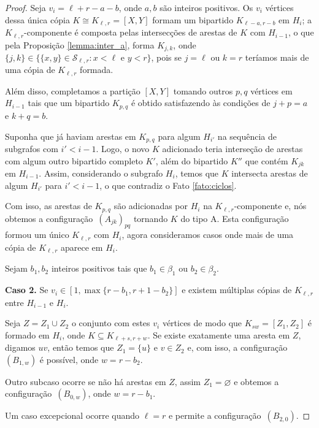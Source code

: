 \documentclass[12pt,a4paper]{book}
\newcommand{\K}{K_{\ell,r}} %
\newcommand{\Slr}{\mathcal{S}_{\ell,r}} %
\let\subset\subseteq
\begin{document}
\begin{proof}
    Seja $v_i= \ell+r-a-b$, onde $a,b$ são inteiros positivos.  
    Os $v_i$ vértices dessa única cópia $K \cong \K= [X,Y]$ formam um bipartido $K_{\ell-a,r-b}$ em $H_i$; a $\K$-componente é composta pelas intersecções de arestas de $K$ com $H_{i-1}$, 
    o que pela Proposição \ref{lemma:inter_a},  forma $K_{j,k}$,
    onde $\{j,k\} \in \{\{x,y\} \in \Slr: x < \ell \text{ e } y < r\}$, pois se $j=\ell$ ou $k=r$ teríamos mais de uma cópia de $\K$ formada.  
   
   Além disso, completamos a partição $[X,Y]$ tomando outros $p,q$ vértices em $H_{i-1}$ tais que um bipartido $K_{p,q}$ é obtido satisfazendo às condições de  $j+p = a$ e $k+q = b$. 
   
   Suponha que já haviam arestas em $K_{p,q}$  para algum $H_{i'}$ na sequência de subgrafos com $i' < i-1$.
   Logo, o novo $K$ adicionado teria interseção de arestas com algum outro bipartido completo $K'$, além do bipartido $K''$ que contém $K_{jk}$ em $H_{i-1}$.
   Assim, considerando o subgrafo $H_{i}$,
   temos que $K$ 
   intersecta arestas de algum $H_{i'}$ para $i'<i-1$, o que contradiz o Fato \ref{fato:ciclos}.
  
     Com isso, as arestas de $K_{p,q}$ são adicionadas por $H_i$ na $\K$-componente e, nós obtemos a configuração~\hyperref[configA]{$(A_{jk})_{pq}$} tornando $K$ do tipo A.  
    Esta configuração formou um único $\K$ com $H_i$,  agora consideramos casos onde mais de uma cópia de $\K$ aparece em $H_i$.

    Sejam $b_1, b_2$ inteiros positivos tais que $b_1 \in \beta_1$ ou $b_2 \in \beta_2$.
    
     \medskip \textbf{Caso 2.} 
    Se $v_i \in [1, \max\{r - b_1, r+1-b_2\}]$ e existem múltiplas cópias de $\K$ entre $H_{i-1}$ e $H_i$.

 
   Seja $Z=Z_1\cup Z_2$ o conjunto com estes $v_i$ vértices de modo que 
   $K_{sw}=[Z_1,Z_2]$ é formado em $H_i$, onde $K \subset K_{\ell+s, r+w}$. 
   Se existe exatamente uma aresta em $Z$, digamos $uv$, então temos que
    $Z_1 = \{u\}$ e $v \in Z_2$ e, com isso, a configuração
    ~\hyperref[configB]{$(B_{1,w})$} é possível, onde $w = r-b_2$.
        
        Outro subcaso ocorre se não há arestas em $Z$, assim $Z_1 =
    \varnothing$ e obtemos a configuração~\hyperref[configB]{$(B_{0,w})$}, 
    onde $w = r-b_1$.
    
    Um caso excepcional ocorre quando $\ell = r$ e permite a
configuração~\hyperref[configB]{$(B_{2,0})$}. 
    

\end{proof}
\end{document}
